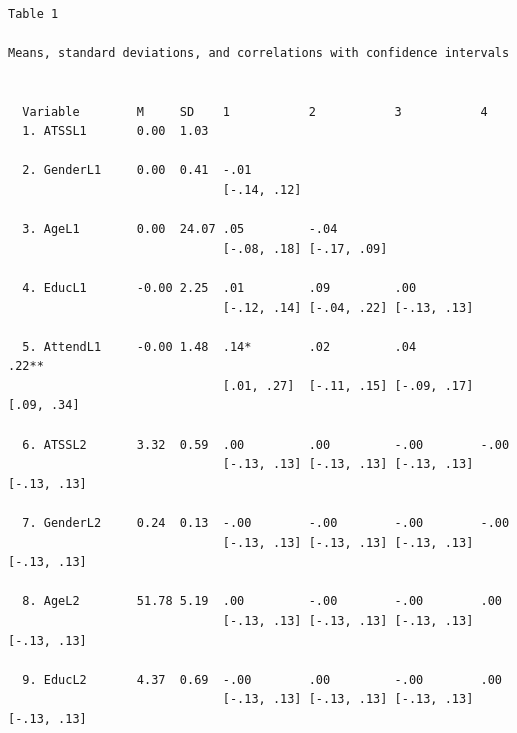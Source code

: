 \documentclass[
  english,
]{book}
\begin{document}
\begin{verbatim}

Table 1 

Means, standard deviations, and correlations with confidence intervals
 

  Variable        M     SD    1           2           3           4          
  1. ATSSL1       0.00  1.03                                                 
                                                                             
  2. GenderL1     0.00  0.41  -.01                                           
                              [-.14, .12]                                    
                                                                             
  3. AgeL1        0.00  24.07 .05         -.04                               
                              [-.08, .18] [-.17, .09]                        
                                                                             
  4. EducL1       -0.00 2.25  .01         .09         .00                    
                              [-.12, .14] [-.04, .22] [-.13, .13]            
                                                                             
  5. AttendL1     -0.00 1.48  .14*        .02         .04         .22**      
                              [.01, .27]  [-.11, .15] [-.09, .17] [.09, .34] 
                                                                             
  6. ATSSL2       3.32  0.59  .00         .00         -.00        -.00       
                              [-.13, .13] [-.13, .13] [-.13, .13] [-.13, .13]
                                                                             
  7. GenderL2     0.24  0.13  -.00        -.00        -.00        -.00       
                              [-.13, .13] [-.13, .13] [-.13, .13] [-.13, .13]
                                                                             
  8. AgeL2        51.78 5.19  .00         -.00        -.00        .00        
                              [-.13, .13] [-.13, .13] [-.13, .13] [-.13, .13]
                                                                             
  9. EducL2       4.37  0.69  -.00        .00         -.00        .00        
                              [-.13, .13] [-.13, .13] [-.13, .13] [-.13, .13]
                                                                             

\end{verbatim}
\end{document}
